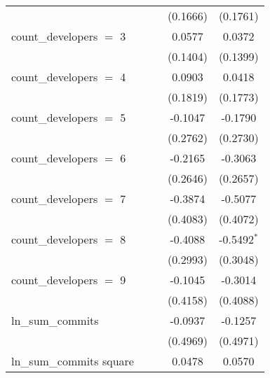 \begin{tabular}{lcccc}
                                        &               &                & (0.1666)       & (0.1761)\\   
   count\_developers $=$ 3              &               &                & 0.0577         & 0.0372\\   
                                        &               &                & (0.1404)       & (0.1399)\\   
   count\_developers $=$ 4              &               &                & 0.0903         & 0.0418\\   
                                        &               &                & (0.1819)       & (0.1773)\\   
   count\_developers $=$ 5              &               &                & -0.1047        & -0.1790\\   
                                        &               &                & (0.2762)       & (0.2730)\\   
   count\_developers $=$ 6              &               &                & -0.2165        & -0.3063\\   
                                        &               &                & (0.2646)       & (0.2657)\\   
   count\_developers $=$ 7              &               &                & -0.3874        & -0.5077\\   
                                        &               &                & (0.4083)       & (0.4072)\\   
   count\_developers $=$ 8              &               &                & -0.4088        & -0.5492$^{*}$\\   
                                        &               &                & (0.2993)       & (0.3048)\\   
   count\_developers $=$ 9              &               &                & -0.1045        & -0.3014\\   
                                        &               &                & (0.4158)       & (0.4088)\\   
   ln\_sum\_commits                     &               &                & -0.0937        & -0.1257\\   
                                        &               &                & (0.4969)       & (0.4971)\\   
   ln\_sum\_commits square              &               &                & 0.0478         & 0.0570\\   

\end{tabular}
